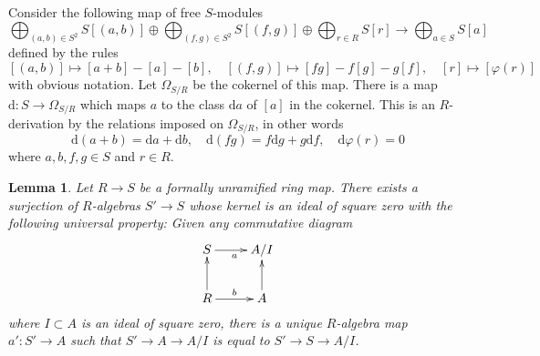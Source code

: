 \documentclass{amsart}
\theoremstyle{plain}
\newtheorem{lemma}[subsection]{Lemma}
\theoremstyle{definition}
\theoremstyle{remark}
\numberwithin{equation}{subsection}
\begin{document}
\medskip\noindent
Consider the following map of free $S$-modules
$$
\bigoplus\nolimits_{(a, b)\in S^2} S[(a, b)] \oplus
\bigoplus\nolimits_{(f, g)\in S^2} S[(f, g)] \oplus
\bigoplus\nolimits_{r\in R} S[r]
\longrightarrow
\bigoplus\nolimits_{a\in S} S[a]
$$
defined by the rules
$$
[(a, b)] \longmapsto [a + b] - [a] - [b],\quad
[(f, g)] \longmapsto [fg] -f[g] - g[f],\quad
[r]      \longmapsto [\varphi(r)]
$$
with obvious notation. Let $\Omega_{S/R}$ be the cokernel of this map.
There is a map $\text{d} : S \to \Omega_{S/R}$ which maps $a$ to the
class $\text{d}a$ of $[a]$ in the cokernel. This is an $R$-derivation
by the relations imposed on $\Omega_{S/R}$, in other words
$$
\text{d}(a + b) = \text{d}a + \text{d}b, \quad
\text{d}(fg) = f\text{d}g + g\text{d}f, \quad
\text{d}\varphi(r) = 0
$$
where $a,b,f,g \in S$ and $r \in R$.


\begin{lemma}
\label{lemma-universal-thickening}
Let $R \to S$ be a formally unramified ring map. There exists a surjection of
$R$-algebras $S' \to S$ whose kernel is an ideal of square zero with the
following universal property: Given any commutative diagram
$$
\xymatrix{
S \ar[r]_a & A/I \\
R \ar[r]^b \ar[u] & A \ar[u]
}
$$
where $I \subset A$ is an ideal of square zero, there is a unique $R$-algebra
map $a' : S' \to A$ such that $S' \to A \to A/I$ is equal to $S' \to S \to A/I$.
\end{lemma}
\end{document}
